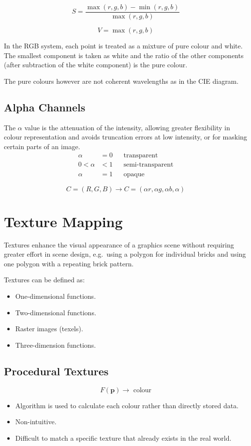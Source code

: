\documentclass[11pt]{article}
\begin{document}
\[
  S = \frac{\max(r,g,b) - \min(r, g, b)}{\max(r, g, b)} 
\]

\[
  V = \max(r, g, b) 
\]

In the RGB system, each point is treated as a mixture of pure colour and white.
The smallest component is taken as white and the ratio of the other components (after subtraction of the white component) is the pure colour.

The pure colours however are not coherent wavelengths as in the CIE diagram.

\subsection{Alpha Channels}
The $\alpha$ value is the attenuation of the intensity, allowing greater flexibility in colour representation and avoids truncation errors at low intensity, or for masking certain parts of an image.
\begin{align*}
  \alpha &= 0 && \text{transparent} \\
  0 < \alpha &< 1 && \text{semi-transparent} \\
  \alpha &= 1 && \text{opaque}
\end{align*}

\[
  C = (R, G, B) \rightarrow C = (\alpha r, \alpha g, \alpha b, \alpha) 
\]

\section{Texture Mapping}
Textures enhance the visual appearance of a graphics scene without requiring greater effort in scene design, e.g.\ using a polygon for individual bricks and using one polygon with a repeating brick pattern.

Textures can be defined as:
\begin{itemize}
  \item One-dimensional functions.
  \item Two-dimensional functions.
  \item Raster images (texels).
  \item Three-dimension functions.
\end{itemize}

\subsection{Procedural Textures}
\[
  F(\bm{p}) \rightarrow \text{ colour} 
\]

\begin{itemize}
  \item Algorithm is used to calculate each colour rather than directly stored data.
  \item Non-intuitive.
  \item Difficult to match a specific texture that already exists in the real world.
\end{itemize}
\end{document}
